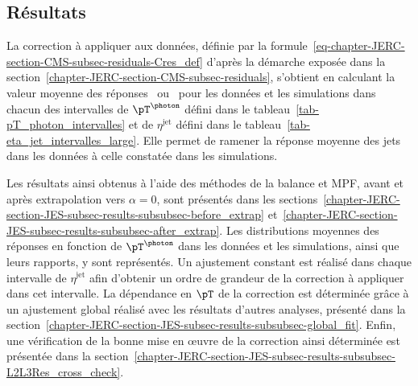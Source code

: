 \subsection{Résultats}\label{chapter-JERC-section-JES-subsec-results}
La correction à appliquer aux données, définie par la formule~\eqref{eq-chapter-JERC-section-CMS-subsec-residuals-Cres_def} d'après la démarche exposée dans la section~\ref{chapter-JERC-section-CMS-subsec-residuals}, s'obtient en calculant la valeur moyenne des réponses \Rbal\ ou \RMPF\ pour les données et les simulations dans chacun des intervalles
de $\pT^{\photon}$ défini dans le tableau~\ref{tab-pT_photon_intervalles} et
de $\eta^\text{jet}$ défini dans le tableau~\ref{tab-eta_jet_intervalles_large}.
Elle permet de ramener la réponse moyenne des jets dans les données à celle constatée dans les simulations.
\par Les résultats ainsi obtenus à l'aide des méthodes de la balance et MPF, avant et après extrapolation vers $\alpha=0$, sont présentés dans les sections~\ref{chapter-JERC-section-JES-subsec-results-subsubsec-before_extrap} et~\ref{chapter-JERC-section-JES-subsec-results-subsubsec-after_extrap}.
Les distributions moyennes des réponses en fonction de $\pT^{\photon}$ dans les données et les simulations, ainsi que leurs rapports, y sont représentés.
Un ajustement constant est réalisé dans chaque intervalle de $\eta^\text{jet}$ afin d'obtenir un ordre de grandeur de la correction à appliquer dans cet intervalle.
La dépendance en $\pT$ de la correction est déterminée grâce à un ajustement global réalisé avec les résultats d'autres analyses, présenté dans la section~\ref{chapter-JERC-section-JES-subsec-results-subsubsec-global_fit}.
Enfin, une vérification de la bonne mise en œuvre de la correction ainsi déterminée est présentée dans la section~\ref{chapter-JERC-section-JES-subsec-results-subsubsec-L2L3Res_cross_check}.
